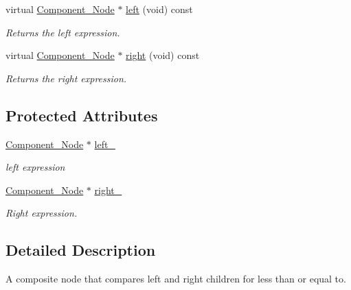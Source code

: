 \begin{DoxyCompactItemize}
virtual \hyperlink{classMadara_1_1Expression__Tree_1_1Component__Node}{Component\_\-Node} $\ast$ \hyperlink{classMadara_1_1Expression__Tree_1_1Composite__Binary__Node_a6ca5cccbc46ccc6026c18f9665298380}{left} (void) const 
\begin{DoxyCompactList}\small\item\em Returns the left expression. \item\end{DoxyCompactList}\item 
virtual \hyperlink{classMadara_1_1Expression__Tree_1_1Component__Node}{Component\_\-Node} $\ast$ \hyperlink{classMadara_1_1Expression__Tree_1_1Composite__Unary__Node_ade55cde5707e0fa73ab1c019159b9aec}{right} (void) const 
\begin{DoxyCompactList}\small\item\em Returns the right expression. \item\end{DoxyCompactList}\end{DoxyCompactItemize}
\subsection*{Protected Attributes}
\begin{DoxyCompactItemize}
\item 
\hyperlink{classMadara_1_1Expression__Tree_1_1Component__Node}{Component\_\-Node} $\ast$ \hyperlink{classMadara_1_1Expression__Tree_1_1Composite__Binary__Node_acac60a70beb2484737e6e7161edb2d1b}{left\_\-}
\begin{DoxyCompactList}\small\item\em left expression \item\end{DoxyCompactList}\item 
\hyperlink{classMadara_1_1Expression__Tree_1_1Component__Node}{Component\_\-Node} $\ast$ \hyperlink{classMadara_1_1Expression__Tree_1_1Composite__Unary__Node_a077b7bd1b52df6f5c6adfde735556a68}{right\_\-}
\begin{DoxyCompactList}\small\item\em Right expression. \item\end{DoxyCompactList}\end{DoxyCompactItemize}


\subsection{Detailed Description}
A composite node that compares left and right children for less than or equal to. 

